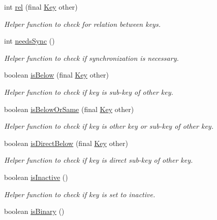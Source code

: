 \begin{DoxyCompactItemize}
int \hyperlink{classorg_1_1libelektra_1_1Key_a75d331aed753dff2fb13f9aaa47cf09c}{rel} (final \hyperlink{classorg_1_1libelektra_1_1Key}{Key} other)
\begin{DoxyCompactList}\small\item\em Helper function to check for relation between keys. \end{DoxyCompactList}\item 
int \hyperlink{classorg_1_1libelektra_1_1Key_a6f5afab907a28b264af0981e9db58c64}{needs\+Sync} ()
\begin{DoxyCompactList}\small\item\em Helper function to check if synchronization is necessary. \end{DoxyCompactList}\item 
boolean \hyperlink{classorg_1_1libelektra_1_1Key_af9a7a7941c07c058f1d4bd6c55e20fe9}{is\+Below} (final \hyperlink{classorg_1_1libelektra_1_1Key}{Key} other)
\begin{DoxyCompactList}\small\item\em Helper function to check if key is sub-\/key of other key. \end{DoxyCompactList}\item 
boolean \hyperlink{classorg_1_1libelektra_1_1Key_ab3143b14824a384ec4b6f9005f6da554}{is\+Below\+Or\+Same} (final \hyperlink{classorg_1_1libelektra_1_1Key}{Key} other)
\begin{DoxyCompactList}\small\item\em Helper function to check if key is other key or sub-\/key of other key. \end{DoxyCompactList}\item 
boolean \hyperlink{classorg_1_1libelektra_1_1Key_a799b0577d5e1491702e45566c943bda4}{is\+Direct\+Below} (final \hyperlink{classorg_1_1libelektra_1_1Key}{Key} other)
\begin{DoxyCompactList}\small\item\em Helper function to check if key is direct sub-\/key of other key. \end{DoxyCompactList}\item 
boolean \hyperlink{classorg_1_1libelektra_1_1Key_a1707144b9d6c0c29531e3e372e1ffaee}{is\+Inactive} ()
\begin{DoxyCompactList}\small\item\em Helper function to check if key is set to inactive. \end{DoxyCompactList}\item 
boolean \hyperlink{classorg_1_1libelektra_1_1Key_a2323fd06287eac6343ed60756f3cc9c1}{is\+Binary} ()

\end{DoxyCompactItemize}
